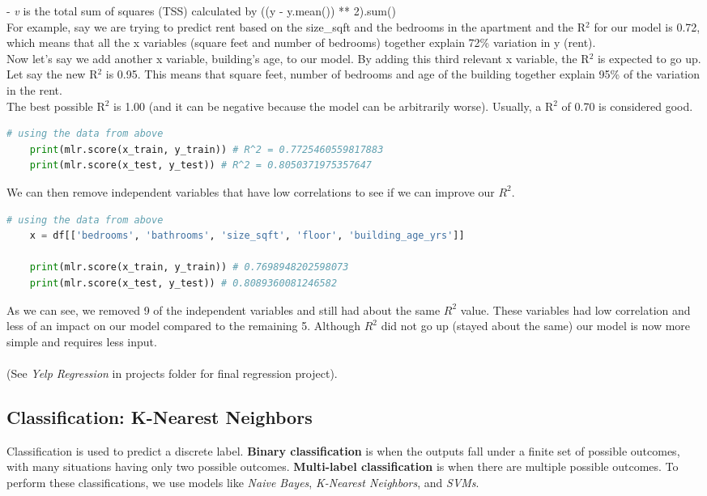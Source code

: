 \documentclass[11pt, a4paper]{article}
\begin{document}
\begin{spacing}{1.1}
	\hspace*{2mm} - \textit{v} is the total sum of squares (TSS) calculated by ((y - y.mean()) ** 2).sum() \vspace*{2mm} \\
	For example, say we are trying to predict rent based on the size\_sqft and the bedrooms in the apartment and the R$^2$ for our model is 0.72, which means that all the x variables (square feet and number of bedrooms) together explain 72\% variation in y (rent). \vspace*{1mm} \\	
	Now let’s say we add another x variable, building’s age, to our model. By adding this third relevant x variable, the R$^2$ is expected to go up. Let say the new R$^2$ is 0.95. This means that square feet, number of bedrooms and age of the building together explain 95\% of the variation in the rent. \vspace*{1mm} \\	
	The best possible R$^2$ is 1.00 (and it can be negative because the model can be arbitrarily worse). Usually, a R$^2$ of 0.70 is considered good.
	\begin{lstlisting}[language=Python]
	# using the data from above
	print(mlr.score(x_train, y_train)) # R^2 = 0.7725460559817883
	print(mlr.score(x_test, y_test)) # R^2 = 0.8050371975357647 \end{lstlisting}\vspace*{1mm}
	We can then remove independent variables that have low correlations to see if we can improve our $R^2$.
	\begin{lstlisting}[language=Python]
	# using the data from above
	x = df[['bedrooms', 'bathrooms', 'size_sqft', 'floor', 'building_age_yrs']]
	
	print(mlr.score(x_train, y_train)) # 0.7698948202598073
	print(mlr.score(x_test, y_test)) # 0.8089360081246582 \end{lstlisting}\vspace*{1mm}
	As we can see, we removed 9 of the independent variables and still had about the same $R^2$ value. These variables had low correlation and less of an impact on our model compared to the remaining 5. Although $R^2$ did not go up (stayed about the same) our model is now more simple and requires less input. \\~\\
	(See \textit{Yelp Regression} in projects folder for final regression project). \newpage
	\subsection{Classification: K-Nearest Neighbors}
	Classification is used to predict a discrete label. \textbf{Binary classification} is when the outputs fall under a finite set of possible outcomes, with many situations having only two possible outcomes. \textbf{Multi-label classification} is when there are multiple possible outcomes. To perform these classifications, we use models like \textit{Naive Bayes}, \textit{K-Nearest Neighbors}, and \textit{SVMs}.

\end{spacing}
\end{document}
